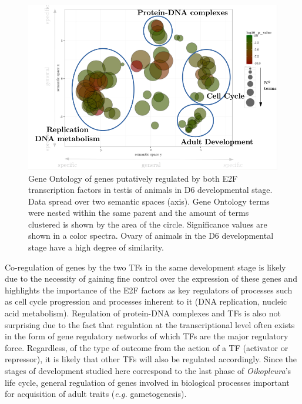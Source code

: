 \documentclass[11pt,twoside,a4paper]{report}
\begin{document}
		\begin{figure}[here]
			\centering
			\includegraphics[width=1\textwidth]{pngs/E2F_overlap_overlaps_GO.png}
			\caption[Gene Ontology of genes putatively regulated by both E2F transcription factors]
			{Gene Ontology of genes putatively regulated by both E2F transcription factors in testis of animals in D6 developmental stage.
				{\footnotesize 
					Data spread over two semantic spaces (axis).
					Gene Ontology terms were nested within the same parent and the amount of terms clustered is shown by the area of the circle.
					Significance values are shown in a color spectra.
					Ovary of animals in the D6 developmental stage have a high degree of similarity.
				}
			}
			\label{fig:GO}
		\end{figure}
		
		Co-regulation of genes by the two TFs in the same development stage is likely due to the necessity of gaining fine control over the expression of these genes and highlights the importance of the E2F factors as key regulators of processes such as cell cycle progression and processes inherent to it (DNA replication, nucleic acid metabolism). Regulation of protein-DNA complexes and TFs is also not surprising due to the fact that regulation at the transcriptional level often exists in the form of gene regulatory networks of which TFs are the major regulatory force. Regardless, of the type of outcome from the action of a TF (activator or repressor), it is likely that other TFs will also be regulated accordingly. Since the stages of development studied here correspond to the last phase of \textit{Oikopleura}'s life cycle, general regulation of genes involved in biological processes important for acquisition of adult traits (\textit{e.g.} gametogenesis).
		
\end{document}
